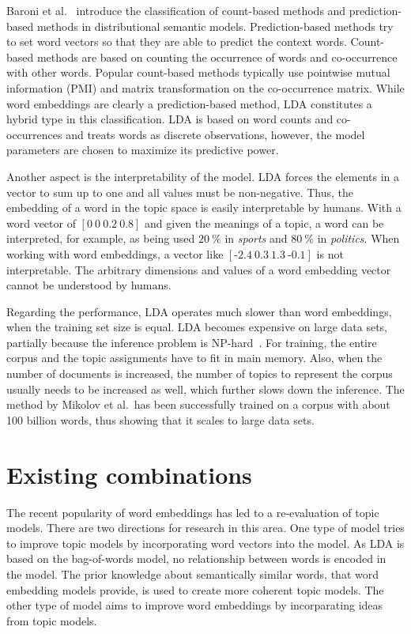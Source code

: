 \documentclass[
        a4paper,
        titlepage,
        twoside,
        parskip
        ]{scrbook}
\theoremstyle{break}
\begin{document}
Baroni et al.~\cite{Baroni2014} introduce the classification of count-based methods and prediction-based methods in distributional semantic models.
Prediction-based methods try to set word vectors so that they are able to predict the context words.
Count-based methods are based on counting the occurrence of words and co-occurrence with other words.
Popular count-based methods typically use pointwise mutual information (PMI) and matrix transformation on the co-occurrence matrix.
While word embeddings are clearly a prediction-based method, LDA constitutes a hybrid type in this classification.
LDA is based on word counts and co-occurrences and treats words as discrete observations, however, the model parameters are chosen to maximize its predictive power.

Another aspect is the interpretability of the model.
LDA forces the elements in a vector to sum up to one and all values must be non-negative.
Thus, the embedding of a word in the topic space is easily interpretable by humans.
With a word vector of $[0~0~0.2~0.8]$ and given the meanings of a topic, a word can be interpreted, for example, as being used $20~\%$ in \emph{sports} and $80~\%$ in \emph{politics}.
When working with word embeddings, a vector like $[{\text{-}2.4}~0.3~1.3~{\text{-}0.1}]$ is not interpretable.
The arbitrary dimensions and values of a word embedding vector cannot be understood by humans.

Regarding the performance, LDA operates much slower than word embeddings, when the training set size is equal.
LDA becomes expensive on large data sets, partially because the inference problem is NP-hard~\cite{Sontag2011}.
For training, the entire corpus and the topic assignments have to fit in main memory.
Also, when the number of documents is increased, the number of topics to represent the corpus usually needs to be increased as well, which further slows down the inference.
The method by Mikolov et al.\ has been successfully trained on a corpus with about 100 billion words, thus showing that it scales to large data sets.

\section{Existing combinations}
The recent popularity of word embeddings has led to a re-evaluation of topic models.
There are two directions for research in this area.
One type of model tries to improve topic models by incorporating word vectors into the model.
As LDA is based on the bag-of-words model, no relationship between words is encoded in the model.
The prior knowledge about semantically similar words, that word embedding models provide, is used to create more coherent topic models.
The other type of model aims to improve word embeddings by incorparating ideas from topic models.
\end{document}
